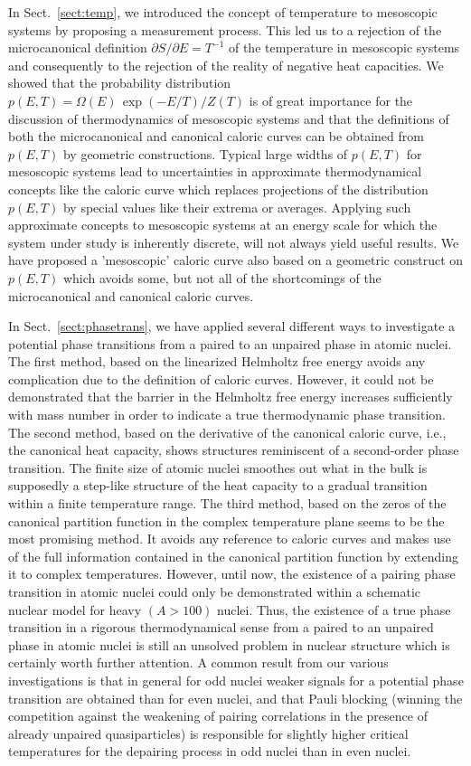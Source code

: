 \documentclass[sort&compress,final,numberedheadings]{aipproc}
\begin{document}
In Sect.\ \ref{sect:temp}, we introduced the concept of temperature to 
mesoscopic systems by proposing a measurement process. This led us to a 
rejection of the microcanonical definition $\partial S/\partial E=T^{-1}$ of 
the temperature in mesoscopic systems and consequently to the rejection of the 
reality of negative heat capacities. We showed that the probability 
distribution $p(E,T)=\Omega(E)\,\exp(-E/T)/Z(T)$ is of great importance for the
discussion of thermodynamics of mesoscopic systems and that the definitions of 
both the microcanonical and canonical caloric curves can be obtained from 
$p(E,T)$ by geometric constructions. Typical large widths of $p(E,T)$ for 
mesoscopic systems lead to uncertainties in approximate thermodynamical 
concepts like the caloric curve which replaces projections of the distribution 
$p(E,T)$ by special values like their extrema or averages. Applying such 
approximate concepts to mesoscopic systems at an energy scale for which the 
system under study is inherently discrete, will not always yield useful 
results. We have proposed a 'mesoscopic' caloric curve also based on a 
geometric construct on $p(E,T)$ which avoids some, but not all of the 
shortcomings of the microcanonical and canonical caloric curves.

In Sect.\ \ref{sect:phasetrans}, we have applied several different ways to 
investigate a potential phase transitions from a paired to an unpaired phase in
atomic nuclei. The first method, based on the linearized Helmholtz free energy 
avoids any complication due to the definition of caloric curves. However, it 
could not be demonstrated that the barrier in the Helmholtz free energy 
increases sufficiently with mass number in order to indicate a true 
thermodynamic phase transition. The second method, based on the derivative of 
the canonical caloric curve, i.e., the canonical heat capacity, shows 
structures reminiscent of a second-order phase transition. The finite size of 
atomic nuclei smoothes out what in the bulk is supposedly a step-like structure
of the heat capacity to a gradual transition within a finite temperature range.
The third method, based on the zeros of the canonical partition function in the
complex temperature plane seems to be the most promising method. It avoids any 
reference to caloric curves and makes use of the full information contained in 
the canonical partition function by extending it to complex temperatures. 
However, until now, the existence of a pairing phase transition in atomic 
nuclei could only be demonstrated within a schematic nuclear model for heavy 
$(A>100)$ nuclei. Thus, the existence of a true phase transition in a rigorous 
thermodynamical sense from a paired to an unpaired phase in atomic nuclei is 
still an unsolved problem in nuclear structure which is certainly worth further
attention. A common result from our various investigations is that in general 
for odd nuclei weaker signals for a potential phase transition are obtained 
than for even nuclei, and that Pauli blocking (winning the competition against 
the weakening of pairing correlations in the presence of already unpaired 
quasiparticles) is responsible for slightly higher critical temperatures for 
the depairing process in odd nuclei than in even nuclei.
\end{document}
